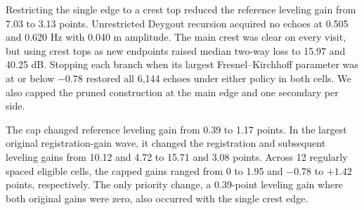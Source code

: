 Restricting the single edge to a crest top reduced the reference leveling gain from 7.03 to 3.13 points. Unrestricted Deygout recursion \cite{DeMinco2025Diffraction} acquired no echoes at 0.505 and 0.620 Hz with 0.040 m amplitude. The main crest was clear on every visit, but using crest tops as new endpoints raised median two-way loss to 15.97 and 40.25 dB. Stopping each branch when its largest Fresnel--Kirchhoff parameter was at or below $-0.78$ restored all 6,144 echoes under either policy in both cells. We also capped the pruned construction at the main edge and one secondary per side.

The cap changed reference leveling gain from 0.39 to 1.17 points. In the largest original registration-gain wave, it changed the registration and subsequent leveling gains from 10.12 and 4.72 to 15.71 and 3.08 points. Across 12 regularly spaced eligible cells, the capped gains ranged from 0 to 1.95 and $-0.78$ to $+1.42$ points, respectively. The only priority change, a 0.39-point leveling gain where both original gains were zero, also occurred with the single crest edge.
